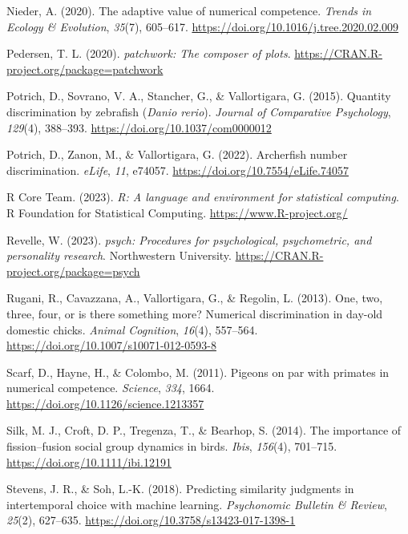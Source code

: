 \documentclass[
  ,pub,floatsintext]{apa6}
\newlength{\cslhangindent}
\newlength{\cslentryspacingunit} %
\newenvironment{CSLReferences}[2] %
 {%
  \setlength{\parindent}{0pt}
  \ifodd #1
  \let\oldpar\par
  \def\par{\hangindent=\cslhangindent\oldpar}
  \fi
  \setlength{\parskip}{#2\cslentryspacingunit}
 }%
 {}
\begin{document}
\begin{CSLReferences}{1}{0}
\leavevmode{}%
Nieder, A. (2020). The adaptive value of numerical competence. \emph{Trends in Ecology \& Evolution}, \emph{35}(7), 605--617. \url{https://doi.org/10.1016/j.tree.2020.02.009}

\leavevmode{}%
Pedersen, T. L. (2020). \emph{{patchwork}: The composer of plots}. \url{https://CRAN.R-project.org/package=patchwork}

\leavevmode{}%
Potrich, D., Sovrano, V. A., Stancher, G., \& Vallortigara, G. (2015). Quantity discrimination by zebrafish (\emph{{Danio} rerio}). \emph{Journal of Comparative Psychology}, \emph{129}(4), 388--393. \url{https://doi.org/10.1037/com0000012}

\leavevmode{}%
Potrich, D., Zanon, M., \& Vallortigara, G. (2022). Archerfish number discrimination. \emph{eLife}, \emph{11}, e74057. \url{https://doi.org/10.7554/eLife.74057}

\leavevmode{}%
R Core Team. (2023). \emph{R: A language and environment for statistical computing}. R Foundation for Statistical Computing. \url{https://www.R-project.org/}

\leavevmode{}%
Revelle, W. (2023). \emph{{psych}: Procedures for psychological, psychometric, and personality research}. Northwestern University. \url{https://CRAN.R-project.org/package=psych}

\leavevmode{}%
Rugani, R., Cavazzana, A., Vallortigara, G., \& Regolin, L. (2013). One, two, three, four, or is there something more? {Numerical} discrimination in day-old domestic chicks. \emph{Animal Cognition}, \emph{16}(4), 557--564. \url{https://doi.org/10.1007/s10071-012-0593-8}

\leavevmode{}%
Scarf, D., Hayne, H., \& Colombo, M. (2011). Pigeons on par with primates in numerical competence. \emph{Science}, \emph{334}, 1664. \url{https://doi.org/10.1126/science.1213357}

\leavevmode{}%
Silk, M. J., Croft, D. P., Tregenza, T., \& Bearhop, S. (2014). The importance of fission--fusion social group dynamics in birds. \emph{Ibis}, \emph{156}(4), 701--715. \url{https://doi.org/10.1111/ibi.12191}

\leavevmode{}%
Stevens, J. R., \& Soh, L.-K. (2018). Predicting similarity judgments in intertemporal choice with machine learning. \emph{Psychonomic Bulletin \& Review}, \emph{25}(2), 627--635. \url{https://doi.org/10.3758/s13423-017-1398-1}


\end{CSLReferences}
\end{document}
